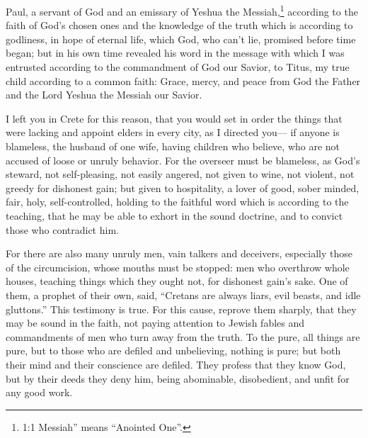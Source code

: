 





\vspace{-1.36in}


\mychapter{} \myverse*{}Paul, a servant of God and an emissary of Yeshua the Messiah,\footnote{1:1 Messiah” means “Anointed One”.} according to the faith of God’s chosen ones and the
knowledge of the truth which is according to godliness,
\myverse{}in hope of eternal life, which God, who can’t lie, promised before time began;
\myverse{}but in his own time revealed his word in the message with which I was entrusted
according to the commandment of God our Savior,
\myverse{}to Titus, my true child according to a common faith: Grace, mercy, and peace
from God the Father and the Lord Yeshua the Messiah our Savior.

\myverse{}I left you in Crete for this reason, that you would set in order
the things that were lacking and appoint elders in every city, as I directed you—
\myverse{}if anyone is blameless, the husband of one wife, having children who believe,
who are not accused of loose or unruly behavior.
\myverse{}For the overseer must be blameless, as God’s steward, not self-pleasing, not
easily angered, not given to wine, not violent, not greedy for dishonest gain;
\myverse{}but given to hospitality, a lover of good, sober minded, fair, holy, self-controlled,
\myverse{}holding to the faithful word which is according to the teaching, that he may
be able to exhort in the sound doctrine, and to convict those who contradict him.

\myverse{}For there are also many unruly men, vain talkers and deceivers,
especially those of the circumcision,
\myverse{}whose mouths must be stopped: men who overthrow whole houses, teaching things
which they ought not, for dishonest gain’s sake.
\myverse{}One of them, a prophet of their own, said, “Cretans are always liars, evil
beasts, and idle gluttons.”
\myverse{}This testimony is true. For this cause, reprove them sharply, that they may
be sound in the faith,
\myverse{}not paying attention to Jewish fables and commandments of men who turn away
from the truth.
\myverse{}To the pure, all things are pure, but to those who are defiled and unbelieving,
nothing is pure; but both their mind and their conscience are defiled.
\myverse{}They profess that they know God, but by their deeds they deny him, being abominable,
disobedient, and unfit for any good work.


